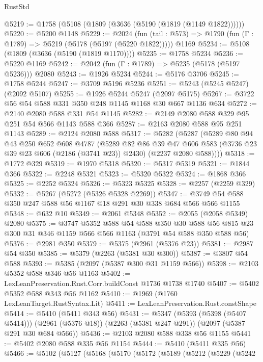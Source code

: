 \begin{lexlean}{RustStd}
\begin{coremodule}
{\begin{coremodule}
{{{{{{{{{{{{{{{@5219 := @1758 (@5108 (@1809 (@3636 (@5190 (@1819 (@1149 @1822))))))
@5220 := @5200 @1148
@5229 := @2024
    (fun (tail : @573) => @1790 (fun (Γ : @1789) => @5219 (@5178 (@5197 (@5220 @1822)))))
    @1169
@5234 := @5108 (@1809 (@3636 (@5190 (@1819 @1170))))
@5235 := @1758 @5234
@5236 := @5220 @1169
@5242 := @2042 (fun (Γ : @1789) => @5235 (@5178 (@5197 @5236))) @2080
@5243 := @1926 @5234
@5244 := @5176 @3706
@5245 := @1758 @5244
@5247 := @3709 @5196 @5236
@5251 := @5243 (@5245 @5247) (@2092 @5107)
@5255 := @1926 @5244 @5247 (@2097 @5175)
@5267 := @3722 @56 @54 @588 @331 @350 @248 @1145 @1168 @30 @667 @1136 @634
@5272 := @2140 @2080 @588 @331 @54 @1145
@5282 := @2149 @2080 @588 @329 @95 @251 @54 @566 @1143 @588 @366
@5287 := @2163 @2080 @588 @95 @251 @1143
@5289 := @2124 @2080 @588
@5317 := @5282
    (@5287
      (@5289
        @80
        @94
        @43
        @250
        @652
        @608
        @4787
        (@5289
          @82
          @86
          @39
          @47
          @606
          @583
          (@3736 @23 @39 @23 @606 (@2186 (@3741 @23)) @2430)
          (@2237 @2080 @588))))
@5318 := @1772 @329
@5319 := @1970 @5318
@5320 := @5317 @5319
@5321 := @1844 @366
@5322 := @2248 @5321
@5323 := @5320 @5322
@5324 := @1868 @366
@5325 := @2252 @5324
@5326 := @5323 @5325
@5328 := @2257 (@2259 @329)
@5332 := @5267 (@5272 (@5326 @5328 @2269))
@5347 := @3749 @54 @588 @350 @247 @588 @56 @1167 @18 @291 @30 @338 @684 @566 @566 @1155
@5348 := @632 @10
@5349 := @2061 @5348
@5352 := @2055 (@2058 @5349) @2080
@5375 := @3747
    @5352
    @588
    @54
    @588
    @350
    @30
    @588
    @56
    @815
    @23
    @300
    @31
    @346
    @1159
    @566
    @566
    @1163
    (@3791 @54 @588 @350 @588 @56)
@5376 := @2981 @350
@5379 := @5375 (@2961 (@5376 @23))
@5381 := @2987 @54 @350
@5385 := @5379 (@2263 (@5381 @30 @300))
@5387 := @3807 @54 @588
@5393 := @5385 (@2097 (@5387 @300 @31 @1159 @566))
@5398 := @2103 @5352 @588 @346 @56 @1163
@5402 := LexLeanPreservation.Rust.Corr.buildConst @1736 @1738 @1740
@5407 := @5402 @5352 @588 @343 @56 @1162
@5410 := @1969 (@1760 LexLeanTarget.RustSyntax.Lit)
@5411 := LexLeanPreservation.Rust.constShape
@5414 := @5410 (@5411 @343 @56)
@5431 := @5347
    (@5393 (@5398 (@5407 @5414)))
    (@2961 (@5376 @18))
    (@2263 (@5381 @247 @291))
    (@2097 (@5387 @291 @30 @684 @566))
@5436 := @2103 @2080 @588 @338 @56 @1155
@5441 := @5402 @2080 @588 @335 @56 @1154
@5444 := @5410 (@5411 @335 @56)
@5466 := @5102
    (@5127
      (@5168
        (@5170
          (@5172
            (@5189
              (@5212
                (@5229
                  (@5242
}}}}}}}}}}}}}}}
\end{coremodule}}
\end{coremodule}
\end{lexlean}
